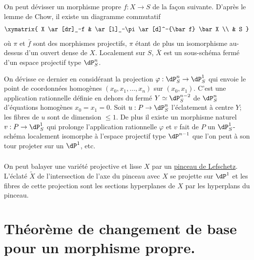 On peut dévisser un morphisme propre $f:X\to S$ de la façon suivante. 
D'après le lemme de Chow, il existe un diagramme commutatif
\[\xymatrix{
  X \ar[dr]_-f 
    & \ar[l]_-\pi \ar[d]^-{\bar f} \bar X \\
  & S
}\]
où $\pi$ et $\bar f$ sont des morphismes projectifs, $\pi$ étant de plus un 
isomorphisme au-dessus d'un ouvert dense de $X$. Localement sur $S$, $\bar X$ 
est un sous-schéma fermé d'un espace projectif type $\dP_S^n$. 

On dévisse ce dernier en considérant la projection 
$\varphi:\dP_S^n\to\dP_S^1$ qui envoie le point de coordonnées homogènes 
$(x_0,x_1,\dotsc,x_n)$ sur $(x_0,x_1)$. C'est une application rationnelle 
définie en dehors du fermé $Y\simeq \dP_S^{n-2}$ de $\dP_S^n$ d'équations 
homogènes $x_0=x_1=0$. Soit $u:P\to \dP_S^n$ l'éclatement à centre 
$Y$; les fibres de $u$ sont de dimension $\leqslant 1$. De plus il existe un 
morphisme naturel $v:P\to \dP_S^1$ qui prolonge l'application rationnelle 
$\varphi$ et $v$ fait de $P$ un $\dP_S^1$-schéma localement isomorphe à 
l'espace projectif type $\dP^{n-1}$ que l'on peut à son tour projeter sur un 
$\dP^1$, etc. 





\subsubsection{}\label{I:3-4-4}

On peut balayer une variété projective et lisse $X$ par un \underline{pinceau de 
Lefschetz}. L'éclaté $\widetilde X$ de l'intersection de l'axe du pinceau 
avec $X$ se projette sur $\dP^1$ et les fibres de cette projection sont les 
sections hyperplanes de $X$ par les hyperplans du pinceau.




















\section{Théorème de changement de base pour un morphisme propre.}\label{I:4}










